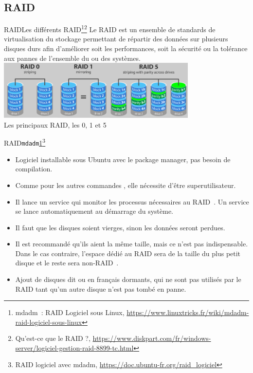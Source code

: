 \documentclass{beamer}
\begin{document}
    \subsection{RAID}\label{subsec:raid}

    \begin{frame}{RAID}{Les différents RAID\footnote{\label{mdadm}mdadm~: RAID Logiciel sous Linux, \url{https://www.linuxtricks.fr/wiki/mdadm-raid-logiciel-sous-linux}}\footnotestep\footnote{Qu'est-ce que le RAID ?, \url{https://www.diskpart.com/fr/windows-server/logiciel-gestion-raid-8899-tc.html}}}
        Le RAID est un ensemble de standards de virtualisation du stockage permettant de répartir des données sur plusieurs disques durs afin d'améliorer soit les performances, soit la sécurité ou la tolérance aux pannes de l'ensemble du ou des systèmes.
        \bigbreak
        \centering
        \includegraphics[width=10cm]{image/raid-0-1-5} \\ Les principaux RAID, les 0, 1 et 5 \\
    \end{frame}

    \begin{frame}{RAID}{\lstinline{mdadm}\cref{mdadm}\footnotestep\footnote{RAID logiciel avec mdadm, \url{https://doc.ubuntu-fr.org/raid_logiciel}}}
        \begin{itemize}
            \item Logiciel installable sous Ubuntu avec le package manager, pas besoin de compilation.
            \item Comme pour les autres commandes , elle nécessite d'être superutilisateur.
            \item Il lance un service qui monitor les processus nécessaires au RAID~.
            Un service se lance automatiquement au démarrage du système.
            \item Il faut que les disques soient vierges, sinon les données seront perdues.
            \item Il est recommandé qu'ils aient la même taille, mais ce n'est pas indispensable.
            Dans le cas contraire, l'espace dédié au RAID sera de la taille du plus petit disque et le reste sera non-RAID~.
            \item Ajout de disques dit  ou en français dormants, qui ne sont pas utilisés par le RAID tant qu'un autre disque n'est pas tombé en panne.
        \end{itemize}
    \end{frame}
\end{document}
